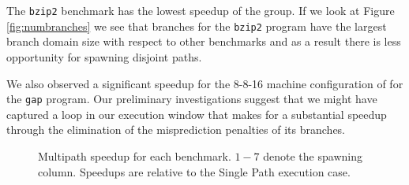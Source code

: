 \documentclass[10pt,dvips]{article}
\begin{document}
The {\tt bzip2} benchmark has the lowest speedup of the group.  
If we look at Figure \ref{fig:numbranches} we 
see that branches for the {\tt bzip2} program have the
largest branch domain size with respect to other benchmarks and as a
result there is less opportunity for spawning disjoint paths.

We also observed a significant speedup for the 8-8-16 machine configuration
of for the {\tt gap} program.  
Our preliminary investigations suggest
that we might have captured
a loop in our execution window that makes for a substantial speedup 
through the elimination
of the misprediction penalties of its branches.
%
\begin{figure}
\centering
{}
\caption{ Multipath speedup for each benchmark.  $1-7$ denote the
spawning column. 
Speedups are relative to the Single Path execution case.}
\label{fig:figall}
\end{figure}
%
%
%
%
%
%
\end{document}
